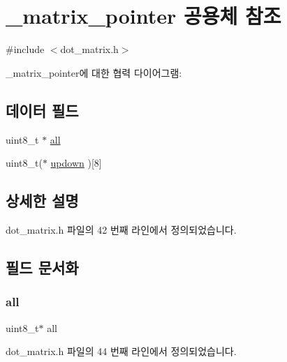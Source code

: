 \hypertarget{union__matrix__pointer}{}\section{\+\_\+matrix\+\_\+pointer 공용체 참조}
\label{union__matrix__pointer}


{\ttfamily \#include $<$dot\+\_\+matrix.\+h$>$}



\+\_\+matrix\+\_\+pointer에 대한 협력 다이어그램\+:
\subsection*{데이터 필드}
\begin{DoxyCompactItemize}
\item 
uint8\+\_\+t $\ast$ \hyperlink{union__matrix__pointer_a0e01cbf81d0496d1344177fe4d90c385}{all}
\item 
uint8\+\_\+t($\ast$ \hyperlink{union__matrix__pointer_a3dbae50b3a3f2163bd477c9873c67cc5}{updown} )\mbox{[}8\mbox{]}
\end{DoxyCompactItemize}


\subsection{상세한 설명}


dot\+\_\+matrix.\+h 파일의 42 번째 라인에서 정의되었습니다.



\subsection{필드 문서화}
\mbox{\label{union__matrix__pointer_a0e01cbf81d0496d1344177fe4d90c385}} 
\subsubsection{\texorpdfstring{all}{all}}
{\footnotesize\ttfamily uint8\+\_\+t$\ast$ all}



dot\+\_\+matrix.\+h 파일의 44 번째 라인에서 정의되었습니다.

\mbox{\label{union__matrix__pointer_a3dbae50b3a3f2163bd477c9873c67cc5}} 
